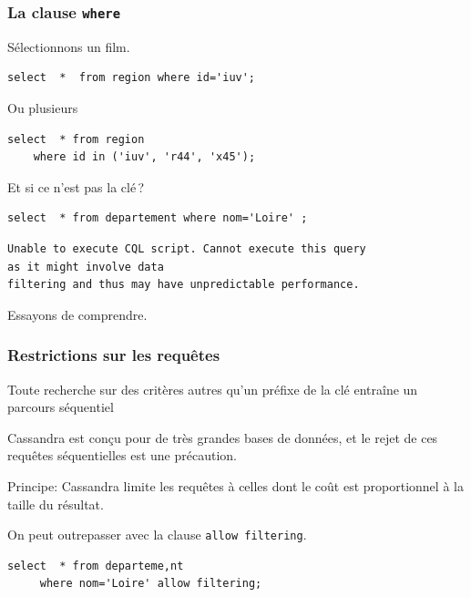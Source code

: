 \begin{frame}[fragile] \frametitle{La clause \texttt{where}}

Sélectionnons un film.

\begin{verbatim}
select  *  from region where id='iuv';
\end{verbatim}

Ou plusieurs

\begin{verbatim}
select  * from region 
    where id in ('iuv', 'r44', 'x45');
\end{verbatim}
 
Et si ce n'est pas la clé\,?

\begin{verbatim}
select  * from departement where nom='Loire' ;
\end{verbatim}

\begin{verbatim}
Unable to execute CQL script. Cannot execute this query 
as it might involve data
filtering and thus may have unpredictable performance. 
\end{verbatim}

Essayons de comprendre.
\end{frame}


\begin{frame}[fragile] \frametitle{Restrictions sur les requêtes}

Toute recherche sur des critères autres qu'un préfixe de la clé entraîne un parcours
séquentiel

\vfill

Cassandra est conçu pour de très grandes bases de données, et le rejet 
de ces requêtes séquentielles est une précaution. 

\vfill

Principe: Cassandra limite les requêtes à celles dont le coût est proportionnel à la 
taille du résultat.

\vfill

On peut outrepasser avec la clause \texttt{allow filtering}.
\begin{verbatim}
select  * from departeme,nt 
     where nom='Loire' allow filtering;
\end{verbatim}


\end{frame}

